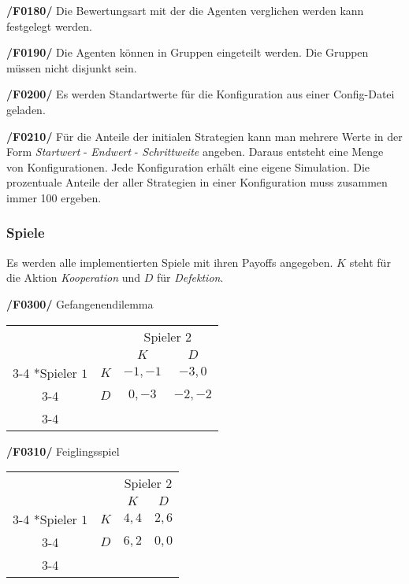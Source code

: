 \textbf{/F0180/} 
Die Bewertungsart mit der die Agenten verglichen werden kann festgelegt werden.

\textbf{/F0190/} 
Die Agenten können in Gruppen eingeteilt werden. Die Gruppen müssen nicht disjunkt sein.

\textbf{/F0200/} 
Es werden Standartwerte für die Konfiguration aus einer Config-Datei geladen.

\textbf{/F0210/} 
Für die Anteile der initialen Strategien kann man mehrere Werte in der Form \emph{Startwert} - \emph{Endwert} - \emph{Schrittweite} angeben. Daraus entsteht eine Menge von Konfigurationen. Jede Konfiguration erhält eine eigene Simulation. Die prozentuale Anteile der aller Strategien in einer Konfiguration muss zusammen immer 100 ergeben. 

\subsubsection{Spiele}
Es werden alle implementierten Spiele mit ihren Payoffs angegeben. $K$ steht für die Aktion \emph{Kooperation} und $D$ für \emph{Defektion}.

\textbf{/F0300/} 
Gefangenendilemma
\begin{table}[H]
\centering
\setlength{\extrarowheight}{2pt}
\begin{tabular}{cc|c|c|}
  & \multicolumn{1}{c}{} & \multicolumn{2}{c}{Spieler $2$} \\
  & \multicolumn{1}{c}{} & \multicolumn{1}{c}{$K$} & \multicolumn{1}{c}{$D$} \\\cline{3-4}
  \multirow{2}*{Spieler $1$} & $K$ & $-1,-1$ & $-3,0$ \\\cline{3-4} 
  & $D$ & $0,-3$ & $-2,-2$ \\\cline{3-4}
\end{tabular}
\end{table}

\textbf{/F0310/} 
Feiglingsspiel
\begin{table}[H]
\centering
\setlength{\extrarowheight}{2pt}
\begin{tabular}{cc|c|c|}
  & \multicolumn{1}{c}{} & \multicolumn{2}{c}{Spieler $2$} \\
  & \multicolumn{1}{c}{} & \multicolumn{1}{c}{$K$} & \multicolumn{1}{c}{$D$} \\\cline{3-4}
  \multirow{2}*{Spieler $1$} & $K$ & $4,4$ & $2,6$ \\\cline{3-4} 
  & $D$ & $6,2$ & $0,0$ \\\cline{3-4}
\end{tabular}
\end{table}

